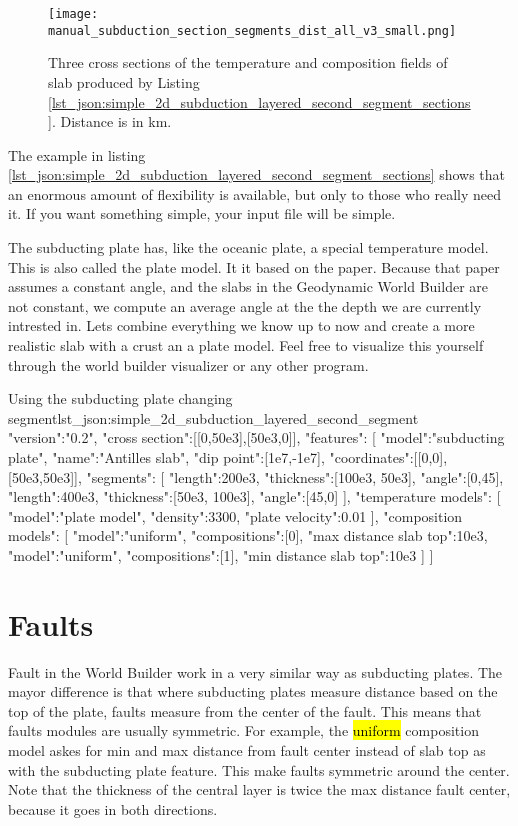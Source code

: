 \documentclass{book}
\newcommand{\GWB}{{Geodynamic World Builder}}
\newcommand{\WB}{{World Builder}}
\begin{document}
\begin{figure}
    \centering
    \texttt{[image: manual\_subduction\_section\_segments\_dist\_all\_v3\_small.png]}
    \caption{Three cross sections of the temperature and composition fields of slab produced by Listing \ref{lst_json:simple_2d_subduction_layered_second_segment_sections}. Distance is in km.}
    \label{fig:simple_2d_subduction_3}
\end{figure}

The example in listing \ref{lst_json:simple_2d_subduction_layered_second_segment_sections} shows that an enormous amount of flexibility is available, but only to those who really need it. If you want something simple, your input file will be simple.

The subducting plate has, like the oceanic plate, a special temperature model. This is also called the plate model. It it based on the \cite{mckenzie1970} paper. Because that paper assumes a constant angle, and the slabs in the \GWB{} are not constant, we compute an average angle at the the depth we are currently intrested in. Lets combine everything we know up to now and create a more realistic slab with a crust an a plate model. Feel free to visualize this yourself through the world builder visualizer or any other program.

\begin{javascriptcode}{Using the subducting plate changing segment}{lst_json:simple_2d_subduction_layered_second_segment}
{
  "version":"0.2",
  "cross section":[[0,50e3],[50e3,0]],
  "features":
  [
     {
       "model":"subducting plate", "name":"Antilles slab", "dip point":[1e7,-1e7],
       "coordinates":[[0,0],[50e3,50e3]], 
     "segments":
     [
         {"length":200e3, "thickness":[100e3, 50e3], "angle":[0,45]},
         {"length":400e3, "thickness":[50e3, 100e3], "angle":[45,0]}
     ],
     "temperature models":
     [
       {"model":"plate model", "density":3300, "plate velocity":0.01}
     ],
     "composition models":
     [
       {"model":"uniform", "compositions":[0], "max distance slab top":10e3},
       {"model":"uniform", "compositions":[1], "min distance slab top":10e3}
     ]
    }
  ]
}
\end{javascriptcode}


\section{Faults}
Fault in the \WB{} work in a very similar way as subducting plates. The mayor difference is that where subducting plates measure distance based on the top of the plate, faults measure from the center of the fault. This means that faults modules are usually symmetric. For example, the \hl{uniform} composition model askes for min and max distance from fault center instead of slab top as with the subducting plate feature. This make faults symmetric around the center. Note that the thickness of the central layer is twice the max distance fault center, because it goes in both directions.
\end{document}
